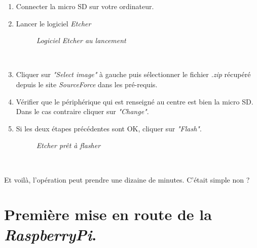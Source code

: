 \begin{enumerate}
	\item Connecter la micro SD sur votre ordinateur.\\
	\item Lancer le logiciel \textit{Etcher}\\
	\begin{figure}[H]
	\begin{center}
	\end{center}
		\caption{ \textit{Logiciel Etcher au lancement}}
	\end{figure}\\
	\item Cliquer sur \textit{"Select image"} à gauche puis sélectionner le fichier \textit{.zip} récupéré depuis le site \textit{SourceForce} dans les pré-requis.\\
	\item Vérifier que le périphérique qui est renseigné au centre est bien la micro SD. Dans le cas contraire cliquer sur \textit{"Change"}.\\
\newpage
	\item Si les deux étapes précédentes sont OK, cliquer sur \textit{"Flash"}.\\
	\begin{figure}[H]
	\begin{center}
	\end{center}
		\caption{ \textit{Etcher prêt à flasher}}
	\end{figure}\\
\end{enumerate}
Et voilà, l'opération peut prendre une dizaine de minutes. C'était simple non ?

\section{Première mise en route de la \textit{RaspberryPi}.}

